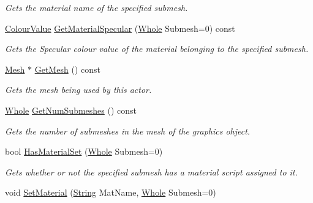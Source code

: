 \begin{DoxyCompactItemize}
\begin{DoxyCompactList}\small\item\em Gets the material name of the specified submesh. \item\end{DoxyCompactList}\item 
\hyperlink{classMezzanine_1_1ColourValue}{ColourValue} \hyperlink{classMezzanine_1_1ActorGraphicsSettings_a1a337f73e07c3c720b52e722877cba6f}{GetMaterialSpecular} (\hyperlink{namespaceMezzanine_adcbb6ce6d1eb4379d109e51171e2e493}{Whole} Submesh=0) const 
\begin{DoxyCompactList}\small\item\em Gets the Specular colour value of the material belonging to the specified submesh. \item\end{DoxyCompactList}\item 
\hyperlink{classMezzanine_1_1Mesh}{Mesh} $\ast$ \hyperlink{classMezzanine_1_1ActorGraphicsSettings_ac88c62f93dbe77814b9046255fab668f}{GetMesh} () const 
\begin{DoxyCompactList}\small\item\em Gets the mesh being used by this actor. \item\end{DoxyCompactList}\item 
\hyperlink{namespaceMezzanine_adcbb6ce6d1eb4379d109e51171e2e493}{Whole} \hyperlink{classMezzanine_1_1ActorGraphicsSettings_af68429600756a08611db19d3fb8af29d}{GetNumSubmeshes} () const 
\begin{DoxyCompactList}\small\item\em Gets the number of submeshes in the mesh of the graphics ohject. \item\end{DoxyCompactList}\item 
bool \hyperlink{classMezzanine_1_1ActorGraphicsSettings_aedc59d9af450d892c7f22eef4c3ff37a}{HasMaterialSet} (\hyperlink{namespaceMezzanine_adcbb6ce6d1eb4379d109e51171e2e493}{Whole} Submesh=0)
\begin{DoxyCompactList}\small\item\em Gets whether or not the specified submesh has a material script assigned to it. \item\end{DoxyCompactList}\item 
void \hyperlink{classMezzanine_1_1ActorGraphicsSettings_a79842ffb70e47691f25d12998e88be68}{SetMaterial} (\hyperlink{namespaceMezzanine_acf9fcc130e6ebf08e3d8491aebcf1c86}{String} MatName, \hyperlink{namespaceMezzanine_adcbb6ce6d1eb4379d109e51171e2e493}{Whole} Submesh=0)

\end{DoxyCompactItemize}
